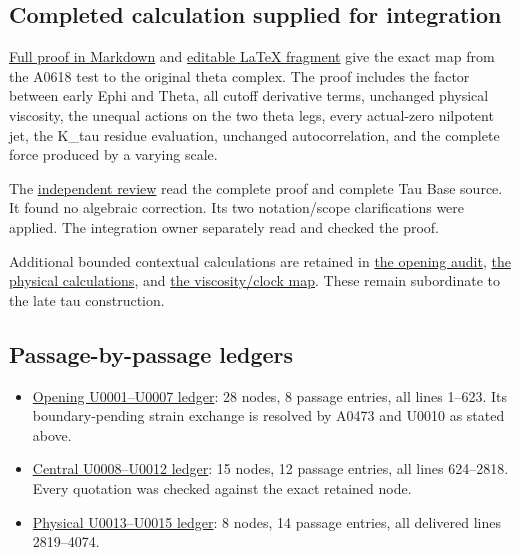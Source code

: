 \subsection{Completed calculation supplied for
integration}\label{TranscriptLedgerStage:completed-calculation-supplied-for-integration}

\href{NS_CUTOFF_THETA_SCALING.md}{Full proof in Markdown} and
\href{NS_CUTOFF_THETA_SCALING.tex}{editable LaTeX fragment} give the
exact map from the A0618 test to the original theta complex. The proof
includes the factor \protect{} between early Ephi and Theta, all
cutoff derivative terms, unchanged physical viscosity, the unequal
actions on the two theta legs, every actual-zero nilpotent jet, the
K\_tau residue evaluation, unchanged autocorrelation, and the complete
force produced by a varying scale.

The \href{physical_bridge/PARENT_SCALING_REVIEW.md}{independent review}
read the complete proof and complete Tau Base source. It found no
algebraic correction. Its two notation/scope clarifications were
applied. The integration owner separately read and checked the proof.

Additional bounded contextual calculations are retained in
\href{ns_context/opening_context_audit.md}{the opening audit},
\href{physical_bridge/CALCULATIONS.md}{the physical calculations}, and
\href{physical_bridge/VISCOSITY_MAP.md}{the viscosity/clock map}. These
remain subordinate to the late tau construction.

\subsection{Passage-by-passage
ledgers}\label{TranscriptLedgerStage:passage-by-passage-ledgers}

\begin{itemize}
\tightlist
\item
  \href{ns_context/opening_context_audit.md}{Opening U0001--U0007
  ledger}: 28 nodes, 8 passage entries, all lines 1--623. Its
  boundary-pending strain exchange is resolved by A0473 and U0010 as
  stated above.
\item
  \href{AUDIT_LOCAL.md}{Central U0008--U0012 ledger}: 15 nodes, 12
  passage entries, all lines 624--2818. Every quotation was checked
  against the exact retained node.
\item
  \href{physical_bridge/AUDIT.md}{Physical U0013--U0015 ledger}: 8
  nodes, 14 passage entries, all delivered lines 2819--4074.
\end{itemize}

